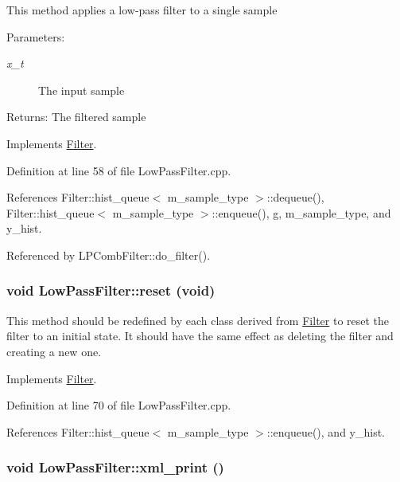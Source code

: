 This method applies a low-pass filter to a single sample \begin{Desc}
\item[Parameters:]
\begin{description}
\item[{\em x\_\-t}]The input sample \end{description}
\end{Desc}
\begin{Desc}
\item[Returns:]The filtered sample \end{Desc}


Implements \hyperlink{classFilter_a3}{Filter}.

Definition at line 58 of file Low\-Pass\-Filter.cpp.

References Filter::hist\_\-queue$<$ m\_\-sample\_\-type $>$::dequeue(), Filter::hist\_\-queue$<$ m\_\-sample\_\-type $>$::enqueue(), g, m\_\-sample\_\-type, and y\_\-hist.

Referenced by LPComb\-Filter::do\_\-filter().\hypertarget{classLowPassFilter_a3}{
\subsubsection[reset]{\setlength{\rightskip}{0pt plus 5cm}void Low\-Pass\-Filter::reset (void)}}
\label{classLowPassFilter_a3}


This method should be redefined by each class derived from \hyperlink{classFilter}{Filter} to reset the filter to an initial state. It should have the same effect as deleting the filter and creating a new one. 

Implements \hyperlink{classFilter_a4}{Filter}.

Definition at line 70 of file Low\-Pass\-Filter.cpp.

References Filter::hist\_\-queue$<$ m\_\-sample\_\-type $>$::enqueue(), and y\_\-hist.\hypertarget{classLowPassFilter_a4}{
\subsubsection[xml\_\-print]{\setlength{\rightskip}{0pt plus 5cm}void Low\-Pass\-Filter::xml\_\-print ()}}
\label{classLowPassFilter_a4}


